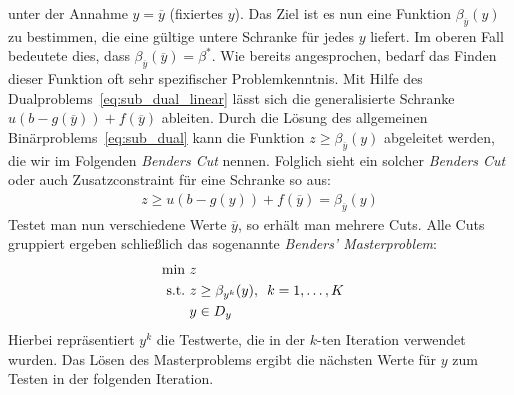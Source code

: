 \documentclass[a4paper, 11pt]{scrreprt}
\begin{document}
unter der Annahme $y = \overline{y}$ (fixiertes $y$).
Das Ziel ist es nun eine Funktion $\beta_{\overline{y}}(y)$ zu bestimmen, die eine gültige untere Schranke
für jedes $y$ liefert. Im oberen Fall bedeutete dies, dass $\beta_{\overline{y}}(\overline{y}) = \beta^*$.
Wie bereits angesprochen, bedarf das Finden dieser Funktion oft sehr spezifischer Problemkenntnis.
Mit Hilfe des Dualproblems~\ref{eq:sub_dual_linear} lässt sich die generalisierte Schranke
$u(b - g(\overline{y})) + f(\overline{y})$ ableiten. Durch die Lösung des allgemeinen Binärproblems~\ref{eq:sub_dual}
kann die Funktion $z\geq \beta_{\overline{y}}(y)$ abgeleitet werden, die wir im Folgenden \textit{Benders Cut} nennen.
Folglich sieht ein solcher \textit{Benders Cut} oder auch Zusatzconstraint für eine Schranke so aus:
\begin{align}
  \label{eq:benders_cut}
  z \geq u(b - g(y)) + f(\overline{y}) = \beta_{\overline{y}}(y)
\end{align}
Testet man nun verschiedene Werte $\overline{y}$, so erhält man mehrere Cuts. Alle Cuts gruppiert
ergeben schließlich das sogenannte \textit{Benders' Masterproblem}:
\begin{align}
  \label{eq:benders_master}
  \text{min}\,\, z \notag\\
  \text{s.t.}\,\, z &\geq \beta_{y^k}(y), \,\,\, k = 1, \dots, K\\
  y &\in D_y\notag
\end{align}
Hierbei repräsentiert $y^k$ die Testwerte, die in der $k$-ten Iteration verwendet wurden. Das Lösen des
Masterproblems ergibt die nächsten Werte für $y$ zum Testen in der folgenden Iteration.
\end{document}
